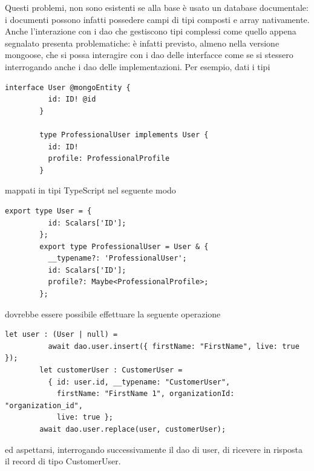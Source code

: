 \documentclass[a4paper, 12pt]{scrartcl}
\begin{document}
      Questi problemi, non sono esistenti se alla base è usato un database documentale: i documenti possono infatti possedere campi di tipi composti e array nativamente.\\

      Anche l'interazione con i dao che gestiscono tipi complessi come quello appena segnalato presenta problematiche: è infatti previsto, almeno nella versione mongoose, che si possa interagire con i dao delle interfacce come se si stessero interrogando anche i dao delle implementazioni.
      Per esempio, dati i tipi
      \begin{Verbatim}[samepage=true]
        interface User @mongoEntity {
          id: ID! @id
        }

        type ProfessionalUser implements User {
          id: ID!
          profile: ProfessionalProfile
        }
      \end{Verbatim}

      mappati in tipi TypeScript nel seguente modo

      \begin{Verbatim}[samepage=true]
        export type User = {
          id: Scalars['ID'];
        };
        export type ProfessionalUser = User & {
          __typename?: 'ProfessionalUser';
          id: Scalars['ID'];
          profile?: Maybe<ProfessionalProfile>;
        };
      \end{Verbatim}

      dovrebbe essere possibile effettuare la seguente operazione

      \begin{Verbatim}[samepage=true]
        let user : (User | null) = 
          await dao.user.insert({ firstName: "FirstName", live: true });
        let customerUser : CustomerUser = 
          { id: user.id, __typename: "CustomerUser",
            firstName: "FirstName 1", organizationId: "organization_id",
            live: true };
        await dao.user.replace(user, customerUser);
      \end{Verbatim}

      ed aspettarsi, interrogando successivamente il dao di user, di ricevere in risposta il record di tipo CustomerUser.

    \newpage
\end{document}
